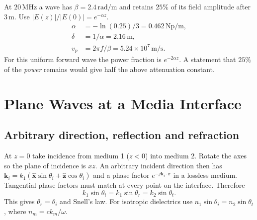 \documentclass[12pt,a4paper]{article}
\begin{document}
\begin{tcolorbox}[examplebox,title={Extract wave parameters from attenuation data}]
At $20\,\mathrm{MHz}$ a wave has $\beta=2.4\,\mathrm{rad/m}$ and retains $25\%$ of its field amplitude after $3\,\mathrm m$. Use $|E(z)|/|E(0)|=e^{-\alpha z}$.
\[
\begin{aligned}
 \alpha&=-\ln(0.25)/3=0.462\,\mathrm{Np/m},\\
 \delta&=1/\alpha=2.16\,\mathrm m,\\
 v_p&=2\pi f/\beta=5.24\times10^7\,\mathrm{m/s}.
\end{aligned}
\]
For this uniform forward wave the power fraction is $e^{-2\alpha z}$. A statement that $25\%$ of the \emph{power} remains would give half the above attenuation constant.
\end{tcolorbox}

\section{Plane Waves at a Media Interface}
\subsection{Arbitrary direction, reflection and refraction}
At $z=0$ take incidence from medium 1 ($z<0$) into medium 2. Rotate the axes so the plane of incidence is $xz$. An arbitrary incident direction then has $\mathbf k_i=k_1(\hat{\mathbf x}\sin\theta_i+\hat{\mathbf z}\cos\theta_i)$ and a phase factor $e^{-j\mathbf k_i\cdot\mathbf r}$ in a lossless medium. Tangential phase factors must match at every point on the interface. Therefore
\[
 k_1\sin\theta_i=k_1\sin\theta_r=k_2\sin\theta_t .
\]
This gives $\theta_r=\theta_i$ and Snell's law. For isotropic dielectrics use $n_1\sin\theta_i=n_2\sin\theta_t$, where $n_m=ck_m/\omega$.
\begin{tcolorbox}[tikzbox,title={Oblique incidence and tangential phase matching},unbreakable]
\centering
{}
\end{tcolorbox}
\end{document}
